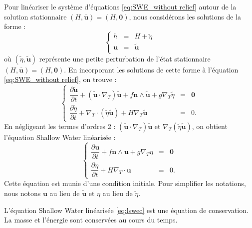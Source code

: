 Pour linéariser le système d'équations \eqref{eq:SWE_without relief} autour de la solution stationnaire $(H, \overline{\mathbf{u}}) = (H,\mathbf{0})$, nous considérons les solutions de la forme :
\begin{equation}
\left\lbrace
\begin{array}{rcl}
h & = & H + \tilde{\eta} \\
\mathbf{u} & = & \tilde{\mathbf{u}} \\
\end{array}
\right.
\end{equation}
où $(\tilde{\eta}, \tilde{\mathbf{u}})$ représente une petite perturbation de l'état stationnaire  $(H, \overline{\mathbf{u}}) = (H,\mathbf{0})$.
En incorporant les solutions de cette forme à l'équation \eqref{eq:SWE_without relief}, on trouve :
\begin{equation}
\left\lbrace
\begin{array}{rcl}
\dfrac{\partial \tilde{\mathbf{u}}}{\partial t} + \left( \tilde{\mathbf{u}} \cdot \nabla_T \right) \tilde{\mathbf{u}} + f \mathbf{n} \wedge \tilde{\mathbf{u}} + g \nabla_T \tilde{\eta} & = & \mathbf{0} \\
\dfrac{\partial \tilde{\eta}}{\partial t} + \nabla_T \cdot \left( \tilde{\eta} \tilde{\mathbf{u}} \right) + H \nabla_T \tilde{\mathbf{u}} & = & 0.
\end{array}
\right.
\end{equation}
En négligeant les termes d'ordres 2 : $(\tilde{\mathbf{u}} \cdot \nabla_T ) \tilde{\mathbf{u}}$ et $\nabla_T (\tilde{\eta} \tilde{\mathbf{u}})$, on obtient l'équation Shallow Water linéarisée :
\begin{equation}
\left\lbrace
\begin{array}{rcl}
\dfrac{\partial \mathbf{u}}{\partial t} + f \mathbf{n} \wedge \mathbf{u} + g \nabla_T \eta & = & \mathbf{0} \\
\dfrac{\partial \eta}{\partial t} +  H \nabla_T \cdot \mathbf{u} & = & 0.
\end{array}
\right.
\label{eq:lswec}
\end{equation}
Cette équation est munie d'une condition initiale.
Pour simplifier les notations, nous notons $\mathbf{u}$ au lieu de $\tilde{\mathbf{u}}$ et $\eta$ au lieu de $\tilde{\eta}$.

L'équation Shallow Water linéarisée \eqref{eq:lswec} est une équation de conservation. La masse et l'énergie sont conservées au cours du temps.

